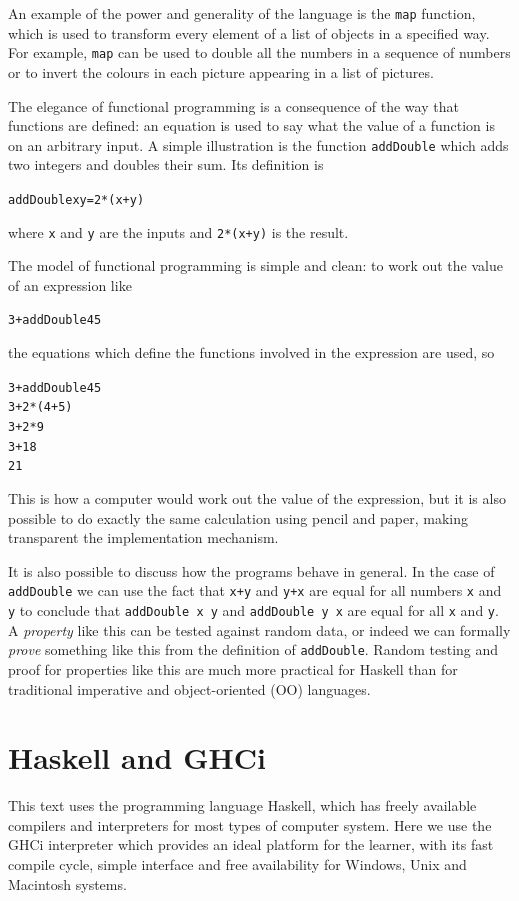 An example of the power and generality of the language is the
\texttt{map} function, which is used to transform every element of a
list of objects in a specified way. For example, \texttt{map} can be used to 
double all the numbers in a sequence of numbers or to invert the colours
in each picture appearing in a list of pictures.

The elegance of functional programming is a consequence of the way that functions
are defined: an equation is used to say what the value of a function is
on an arbitrary input. A simple illustration is the function
\texttt{addDouble} which adds two integers and doubles their sum. Its
definition is
\begin{alltt}
addDouble x y = 2*(x+y)
\end{alltt}
where \texttt{x} and \texttt{y} are the inputs and \texttt{2*(x+y)} is
the result.

The model of functional programming is simple and clean:
to work out the value of an expression like 
\begin{alltt}
3 + addDouble 4 5
\end{alltt}
the equations which define the functions
involved in the expression are used, so
\begin{alltt}
3 + addDouble 4 5
\step{}3 + 2*(4+5)
\step{}3 + 2*9
\step{}3 + 18
\step{}21
\end{alltt}
This is how a computer would work out the value of the expression, but it is also possible
to do exactly the same calculation
using pencil and paper, making transparent the implementation
mechanism.

It is also possible to
discuss how the programs behave in general. In the case of
\texttt{addDouble}
we can use the fact that \texttt{x+y} and \texttt{y+x} are equal for all
numbers \texttt{x} and \texttt{y}
to conclude that \texttt{addDouble x y}
and \texttt{addDouble y x} are equal for all \texttt{x}
and \texttt{y}. A \emph{property} like this can be tested against random data, or indeed we can formally \emph{prove} something like this from the definition of \texttt{addDouble}. Random testing and proof for properties like this are much more practical for Haskell than for
traditional imperative and object-oriented (OO) languages.

\section*{Haskell and GHCi}

This text uses the programming language Haskell, which has freely available 
compilers and interpreters for most types of computer system. Here we use the GHCi  interpreter which provides an ideal
platform for the learner, with its fast compile cycle, simple interface
and free availability for Windows, Unix and Macintosh systems. 


